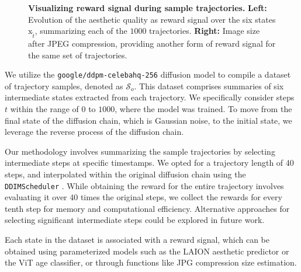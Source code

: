 \begin{figure}[ht]
\begin{minipage}{0.5\textwidth}
  \end{minipage}
  \vspace{-8pt}  %
    \captionsetup{width=\textwidth} %
    \caption{\textbf{Visualizing reward signal during sample trajectories.} \textbf{Left:} Evolution of the aesthetic quality as reward signal over the six states $\mathrm{x}_{\tilde{t}}$, summarizing each of the $1000$ trajectories. \textbf{Right:} Image size after JPEG compression, providing another form of reward signal for the same set of trajectories.}
  \label{fig:samples-trajectory-rewards} %
\end{figure}


We utilize the \texttt{google/ddpm-celebahq-256} diffusion model \cite{ho2020denoising} to compile a dataset of trajectory samples, denoted as $\mathcal{S}_o$. This dataset comprises summaries of six intermediate states extracted from each trajectory. We specifically consider steps $t$ within the range of $0$ to $1000$, where the model was trained. To move from the final state of the diffusion chain, which is Gaussian noise, to the initial state, we leverage the reverse process of the diffusion chain.

Our methodology involves summarizing the sample trajectories by selecting intermediate steps at specific timestamps. We opted for a trajectory length of 40 steps, and interpolated within the original diffusion chain using the \texttt{DDIMScheduler} \cite{song2020denoising}. While obtaining the reward for the entire trajectory involves evaluating it over 40 times the original steps, we collect the rewards for every tenth step for memory and computational efficiency. Alternative approaches for selecting significant intermediate steps could be explored in future work.

Each state in the dataset is associated with a reward signal, which can be obtained using parameterized models such as the LAION aesthetic predictor or the ViT age classifier, or through functions like JPG compression size estimation.

